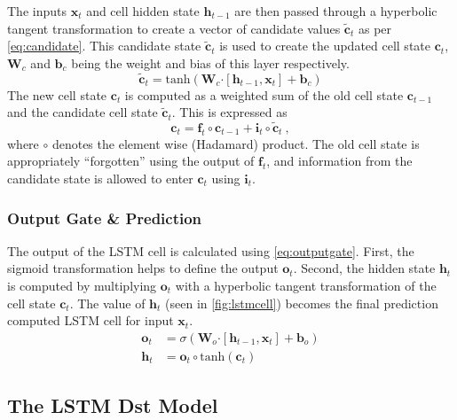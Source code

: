 The inputs $\mathbf{x}_t$ and cell hidden state $\mathbf{h}_{t-1}$ are then passed through a 
hyperbolic tangent transformation to create a vector of candidate values $\tilde{\mathbf{c}}_{t}$ 
as per \cref{eq:candidate}. This candidate state $\tilde{\mathbf{c}}_{t}$ is used to create the 
updated cell state $\mathbf{c}_{t}$, $\mathbf{W}_{c}$  and  $\mathbf{b}_{c}$ being the weight and 
bias of this layer respectively.
%
\begin{equation}\label{eq:candidate}
 \tilde{\mathbf{c}}_{t} = \text{tanh} \left( \mathbf{W}_{c} \boldsymbol{\cdot}  \left[ \mathbf{h}_{t-1},\mathbf{x}_t \right] + 
 \mathbf{b}_{c} \right)
\end{equation}
%
The new cell state $\mathbf{c}_t$ is computed as a weighted sum of the old cell state 
$\mathbf{c}_{t-1}$ and the candidate cell state $\tilde{\mathbf{c}}_{t}$. This is expressed as 
%
\begin{equation}\label{eq:newstate}
 \mathbf{c}_t = \mathbf{f}_{t} \circ \mathbf{c}_{t-1} + \mathbf{i}_{t} \circ \tilde{\mathbf{c}}_{t} \ ,
\end{equation}
where $\circ$ denotes the element wise (Hadamard) product. The old cell state is appropriately 
\enquote{forgotten} using the output of $\mathbf{f}_t$, and information from the candidate state 
is allowed to enter $\mathbf{c}_t$ using $\mathbf{i}_t$.

\subsubsection*{Output Gate \& Prediction}

The output of the LSTM cell is calculated using \cref{eq:outputgate}. First, the sigmoid 
transformation helps to define the output $\mathbf{o}_t$. Second, the hidden state $\mathbf{h}_t$ 
is computed by multiplying $\mathbf{o}_{t}$ with a hyperbolic tangent transformation of the cell 
state $\mathbf{c}_{t}$. The value of $\mathbf{h}_{t}$ (seen in \cref{fig:lstmcell}) becomes the 
final prediction computed LSTM cell for input $\mathbf{x}_t$.
%
\begin{align} \label{eq:outputgate}
	\mathbf{o}_{t} &= \sigma \left( 
		\mathbf{W}_o \boldsymbol{\cdot} \left[\mathbf{h}_{t-1}, \mathbf{x}_{t} \right] + \mathbf{b}_o \right) \\
	\mathbf{h}_{t} &= \mathbf{o}_{t} \circ \text{tanh}(\mathbf{c}_t)
\end{align}

\subsection{The LSTM Dst Model}\label{sec:lstmDstArch}

